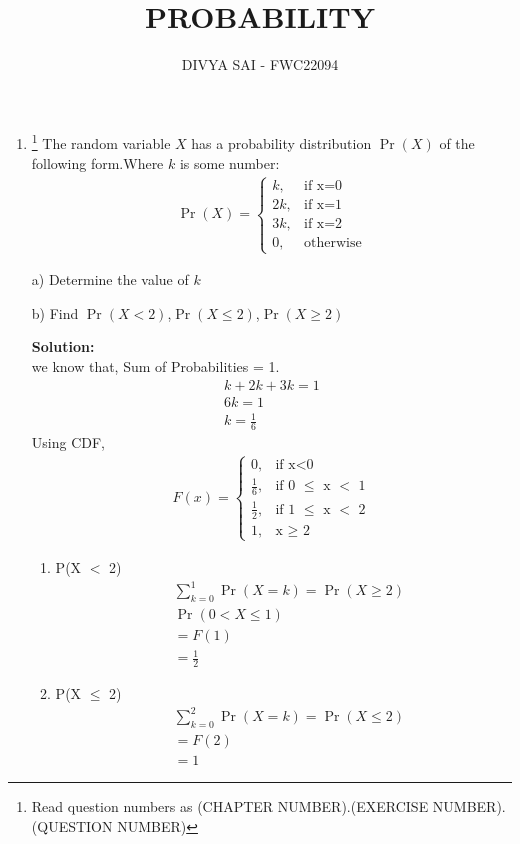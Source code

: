 \documentclass{article}
\providecommand{\pr}[1]{\ensuremath{\Pr\left(#1\right)}}
\newcommand{\solution}{\noindent \textbf{Solution: }}
\begin{document}
\title{PROBABILITY}
\author{\Large DIVYA SAI - FWC22094}
\date{}

\maketitle
\begin{enumerate}
[label=16.\arabic{enumi}.\arabic{enumii}]%
\setcounter{enumi}{3}
\setcounter{enumii}{10}

\item \footnote{Read question numbers as (CHAPTER NUMBER).(EXERCISE NUMBER).(QUESTION NUMBER)} {The random variable $X$ has a probability distribution \pr{X} of the following form.Where $k$ is some number: }
\begin{align}
  \pr{X} =
    \begin{cases}
      k,  & \text{if x=0}\\
      2k, & \text{if x=1}\\
      3k, & \text{if x=2}\\
      0 , & \text{otherwise}
    \end{cases}       
\end{align}

a) Determine the value of $k$ 

b) Find \pr{X < 2},\pr{X \leq 2},\pr{X \geq 2}  


\solution\\
we know that,
Sum of Probabilities = 1.
\begin{align}
&k + 2k + 3k  = 1 &\\
&6k = 1 &\\
&k = \frac{1}{6}&
\end{align}
Using CDF,
\begin{align}
  F(x) =
    \begin{cases}
      0,  & \text{if x$<$0}\\
      \frac{1}{6}, & \text{if 0 $\leq$ x $<$ 1}\\
      \frac{1}{2}, & \text{if 1 $\leq$ x $<$ 2}\\
      1 , & \text{x $\geq$ 2}
    \end{cases}       
\end{align}

 \begin{enumerate}
        \item P(X $<$ 2)
           \begin{align}
           &\sum_{k = 0}^1 \pr{X = k} = \pr{X \ge 2}\\
            & \pr{0 < X \le 1} \\
            & = F(1)\\
            & = \frac{1}{2}
        \end{align}
        \item P(X $\leq$ 2)
        \begin{align}
         &\sum_{k = 0}^2  \pr{X = k} = \pr{X \le 2}\\
            & = F(2)\\
            & = 1   
        \end{align}
        

\end{enumerate}
\end{enumerate}
\end{document}
